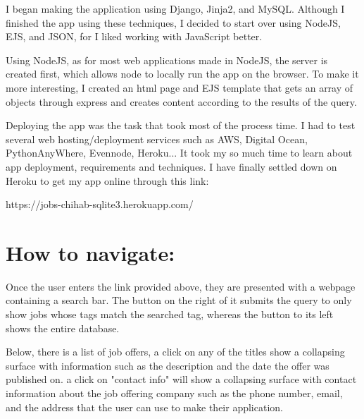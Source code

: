 \documentclass[french]{article}
\begin{document}
		I began making the application using Django, Jinja2, and MySQL. Although I finished the app using these techniques, I decided to start over using NodeJS, EJS, and JSON, for I liked working with JavaScript better.
		
		Using NodeJS, as for most web applications made in NodeJS, the server is created first, which allows node to locally run the app on the browser. To make it more interesting, I created an html page and EJS template that gets an array of objects through express and creates content according to the results of the query.
		
		Deploying the app was the task that took most of the process time. I had to test several web hosting/deployment services such as AWS, Digital Ocean, PythonAnyWhere, Evennode, Heroku... It took my so much time to learn about app deployment, requirements and techniques. I have finally settled down on Heroku to get my app online through this link:
		\vspace{0.25cm}
		
		https://jobs-chihab-sqlite3.herokuapp.com/
		
	\section{How to navigate:}
		Once the user enters the link provided above, they are presented with a webpage containing a search bar. The button on the right of it submits the query to only show jobs whose tags match the searched tag, whereas the button to its left shows the entire database.
		
		Below, there is a list of job offers, a click on any of the titles show a collapsing surface with information such as the description and the date the offer was published on. a click on "contact info" will show a collapsing surface with contact information about the job offering company such as the phone number, email, and the address that the user can use to make their application.
\end{document}
